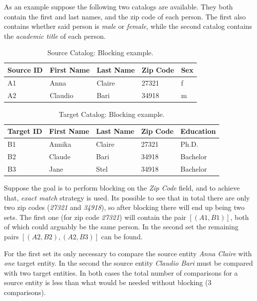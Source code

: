 \documentclass[epsfig,a4paper,11pt,titlepage,twoside,openany]{book}
\begin{document}
As an example suppose the following two catalogs are available. They both contain the
first and last names, and the zip code of each person. The first also contains
whether said person is \textit{male} or \textit{female}, while the second catalog
contains the \textit{academic title} of each person.

\begin{table}[H]
  \centering
  \begin{tabular}{l|l|l|l|l}
    Source ID & First Name & Last Name & Zip Code & Sex \\ \hline
    A1        & Anna       & Claire    & 27321    & f   \\
    A2        & Claudio    & Bari      & 34918    & m  
  \end{tabular}
  \caption{Source Catalog: Blocking example.}
  \label{tab:blocking-ex-source}
\end{table}

\begin{table}[H]
  \centering
  \begin{tabular}{l|l|l|l|l}
    Target ID & First Name & Last Name & Zip Code & Education \\ \hline
    B1        & Annika     & Claire    & 27321    & Ph.D.     \\
    B2        & Claude     & Bari      & 34918    & Bachelor  \\
    B3        & Jane       & Stel      & 34918    & Bachelor 
  \end{tabular}
  \caption{Target Catalog: Blocking example.}
  \label{tab:blocking-ex-target}
\end{table}

Suppose the goal is to perform blocking on the \textit{Zip Code} field, and to achieve that, 
\textit{exact match} strategy is used. Its possible to see that in total there are only two zip
codes (\textit{27321} and \textit{34918}), so after blocking there will end up being two sets. The first one (for zip code \textit{27321}) will contain the pair
$[(A1, B1)]$, both of which could arguably be the same person. In the second set the remaining pairs $[(A2, B2), (A2, B3)]$ can be found.

For the first set its only necessary to compare the source entity \textit{Anna Claire}
with \textit{one} target entity. In the second the
source entity \textit{Claudio Bari} must be compared with two target entities. In both cases the
total number of comparisons for a source entity is less than what would be needed
without blocking (3 comparisons).
\end{document}

